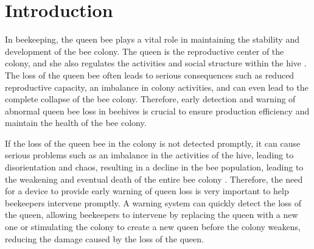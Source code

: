 \section{Introduction}
In beekeeping, the queen bee plays a vital role in maintaining the stability and development
of the bee colony. The queen is the reproductive center of the colony, and she also regulates
the activities and social structure within the hive \cite{anton2022introduction}. The loss of the queen bee
often leads to serious consequences such as reduced reproductive capacity, an imbalance in
colony activities, and can even lead to the complete collapse of the bee colony. Therefore,
early detection and warning of abnormal queen bee loss in beehives is crucial to ensure
production efficiency and maintain the health of the bee colony.

If the loss of the queen bee in the colony is not detected promptly, it can cause serious
problems such as an imbalance in the activities of the hive, leading to disorientation and
chaos, resulting in a decline in the bee population, leading to the weakening and eventual
death of the entire bee colony \cite{honey_bee_colony_2021}. Therefore, the need for a device to provide early
warning of queen loss is very important to help beekeepers intervene promptly. A warning
system can quickly detect the loss of the queen, allowing beekeepers to intervene by
replacing the queen with a new one or stimulating the colony to create a new queen before
the colony weakens, reducing the damage caused by the loss of the queen.
